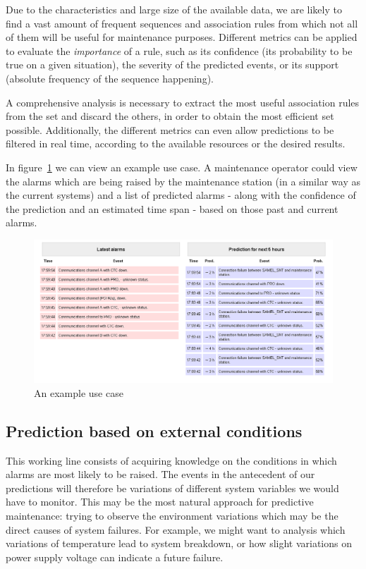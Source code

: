 \documentclass[a4paper,12pt]{article}
\begin{document}
Due to the characteristics and large size of the available data, we are likely to find a vast amount of frequent sequences and association rules from which not all of them will be useful for maintenance purposes. Different metrics can be applied to evaluate the \emph{importance} of a rule, such as its confidence (its probability to be true on a given situation), the severity of the predicted events, or its support (absolute frequency of the sequence happening).

A comprehensive analysis is necessary to extract the most useful association rules from the set and discard the others, in order to obtain the most efficient set possible. Additionally, the different metrics can even allow predictions to be filtered in real time, according to the available resources or the desired results.

In figure~\ref{fig:demo_view} we can view an example use case. A maintenance operator could view the alarms which are being raised by the maintenance station (in a similar way as the current systems) and a list of predicted alarms - along with the confidence of the prediction and an estimated time span - based on those past and current alarms.

\begin{figure}[hbtp]
\includegraphics[width=\textwidth]{img/demo_thales.png}
\caption{An example use case} \label{fig:demo_view}
\end{figure}

\subsection{Prediction based on external conditions}\label{sec:external}
This working line consists of acquiring knowledge on the conditions in which alarms are most likely to be raised. The events in the antecedent of our predictions will therefore be variations of different system variables we would have to monitor. This may be the most natural approach for predictive maintenance: trying to observe the environment variations which may be the direct causes of system failures. For example, we might want to analysis which variations of temperature lead to system breakdown, or how slight variations on power supply voltage can indicate a future failure.
\end{document}
